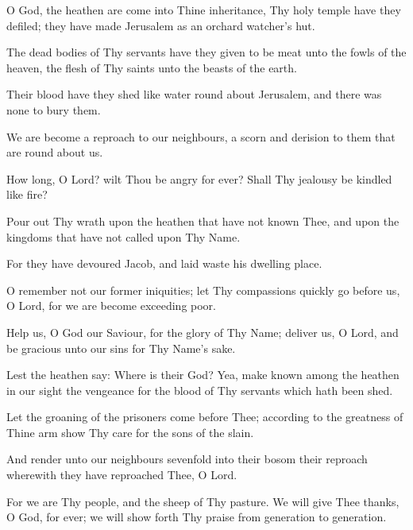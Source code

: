 O God, the heathen are come into Thine inheritance, Thy holy temple have they defiled; they have made Jerusalem as an orchard watcher’s hut.

The dead bodies of Thy servants have they given to be meat unto the fowls of the heaven, the flesh of Thy saints unto the beasts of the earth.

Their blood have they shed like water round about Jerusalem, and there was none to bury them.

We are become a reproach to our neighbours, a scorn and derision to them that are round about us.

How long, O Lord? wilt Thou be angry for ever? Shall Thy jealousy be kindled like fire?

Pour out Thy wrath upon the heathen that have not known Thee, and upon the kingdoms that have not called upon Thy Name.

For they have devoured Jacob, and laid waste his dwelling place.

O remember not our former iniquities; let Thy compassions quickly go before us, O Lord, for we are become exceeding poor.

Help us, O God our Saviour, for the glory of Thy Name; deliver us, O Lord, and be gracious unto our sins for Thy Name's sake.

Lest the heathen say: Where is their God? Yea, make known among the heathen in our sight the vengeance for the blood of Thy servants which hath been shed.

Let the groaning of the prisoners come before Thee; according to the greatness of Thine arm show Thy care for the sons of the slain.

And render unto our neighbours sevenfold into their bosom their reproach wherewith they have reproached Thee, O Lord.

For we are Thy people, and the sheep of Thy pasture. We will give Thee thanks, O God, for ever; we will show forth Thy praise from generation to generation.
